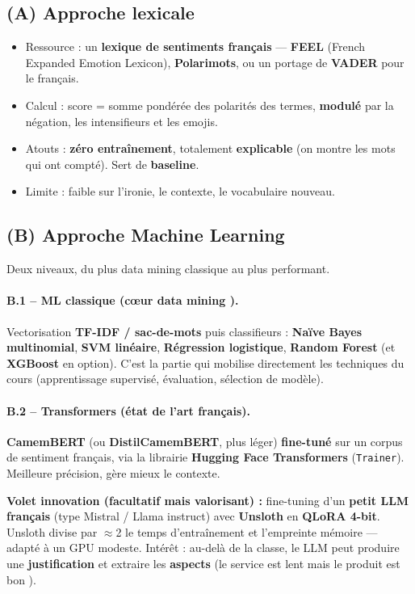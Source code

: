 \documentclass[11pt,a4paper]{article}
\newcommand{\code}[1]{\texttt{\small #1}}
\begin{document}
\subsection{(A) Approche lexicale}
\begin{itemize}[leftmargin=1.2cm,nosep]
  \item Ressource : un \textbf{lexique de sentiments français} ---
        \textbf{FEEL} (French Expanded Emotion Lexicon), \textbf{Polarimots},
        ou un portage de \textbf{VADER} pour le français.
  \item Calcul : score = somme pondérée des polarités des termes, \textbf{modulé}
        par la négation, les intensifieurs et les emojis.
  \item Atouts : \textbf{zéro entraînement}, totalement \textbf{explicable}
        (on montre les mots qui ont compté). Sert de \textbf{baseline}.
  \item Limite : faible sur l'ironie, le contexte, le vocabulaire nouveau.
\end{itemize}

\subsection{(B) Approche Machine Learning}
Deux niveaux, du plus \og data mining classique \fg{} au plus performant.

\paragraph{B.1 -- ML classique (c\oe ur \og data mining \fg{}).}
Vectorisation \textbf{TF-IDF / sac-de-mots} puis classifieurs :
\textbf{Naïve Bayes multinomial}, \textbf{SVM linéaire}, \textbf{Régression
logistique}, \textbf{Random Forest} (et \textbf{XGBoost} en option). C'est la
partie qui mobilise directement les techniques du cours (apprentissage
supervisé, évaluation, sélection de modèle).

\paragraph{B.2 -- Transformers (état de l'art français).}
\textbf{CamemBERT} (ou \textbf{DistilCamemBERT}, plus léger) \textbf{fine-tuné}
sur un corpus de sentiment français, via la librairie \textbf{Hugging Face
Transformers} (\code{Trainer}). Meilleure précision, gère mieux le contexte.

\begin{decision}
\textbf{Volet \og innovation \fg{} (facultatif mais valorisant) :} fine-tuning
d'un \textbf{petit LLM français} (type Mistral / Llama instruct) avec
\textbf{Unsloth} en \textbf{QLoRA 4-bit}. Unsloth divise par $\approx$2 le temps
d'entraînement et l'empreinte mémoire --- adapté à un GPU modeste. Intérêt :
au-delà de la classe, le LLM peut produire une \textbf{justification} et extraire
les \textbf{aspects} (\og le service est lent mais le produit est bon \fg{}).
\end{decision}
\end{document}
